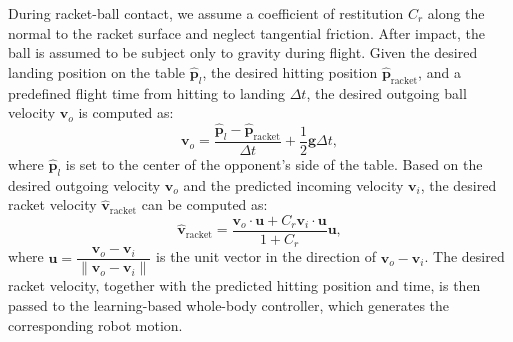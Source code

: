 During racket-ball contact, we assume a coefficient of restitution $C_r$ along the normal to the racket surface and neglect tangential friction. After impact, the ball is assumed to be subject only to gravity during flight. Given the desired landing position on the table $\hat{\mathbf{p}}_l$, the desired hitting position $\hat{\mathbf{p}}_{\mathrm{racket}}$, and a predefined flight time from hitting to landing $\Delta t$, the desired outgoing ball velocity $\mathbf{v}_o$ is computed as:
\begin{equation}
\mathbf{v}_o=\dfrac{\hat{\mathbf{p}}_l-\hat{\mathbf{p}}_\mathrm{racket}}{\Delta t}+\frac{1}{2}\mathbf{g}\Delta t,
\end{equation}
where $\hat{\mathbf{p}}_l$ is set to the center of the opponent’s side of the table. Based on the desired outgoing velocity $\mathbf{v}_o$ and the predicted incoming velocity $\mathbf{v}_i$, the desired racket velocity $\hat{\mathbf{v}}_{\mathrm{racket}}$ can be computed as:
\begin{equation}
\hat{\mathbf{v}}_{\mathrm{racket}} = \dfrac{\mathbf{v}_o\cdot\mathbf{u}+C_r \mathbf{v}_i\cdot\mathbf{u}}{1+C_r}\mathbf{u},
\end{equation}
where $\mathbf{u}=\dfrac{\mathbf{v}_o - \mathbf{v}_i}{\|\mathbf{v}_o - \mathbf{v}_i\|}$ is the unit vector in the direction of $\mathbf{v}_o - \mathbf{v}_i$. 
The desired racket velocity, together with the predicted hitting position and time, is then passed to the learning-based whole-body controller, which generates the corresponding robot motion.
